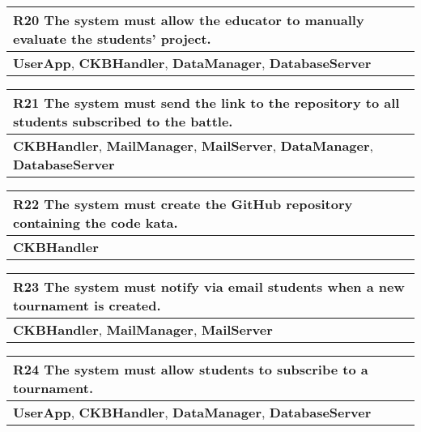 \begin{table}[H]
    \begin{tabularx}{\textwidth}{X}
        \toprule
        \textbf{R20} The system must allow the educator to manually evaluate the students' project. \\ \midrule
        \textbf{UserApp}, \textbf{CKBHandler}, \textbf{DataManager}, \textbf{DatabaseServer} \\
        \end{tabularx}
\end{table}

\begin{table}[H]
    \begin{tabularx}{\textwidth}{X}
        \toprule
        \textbf{R21} The system must send the link to the repository to all students subscribed to the battle.\\ \midrule
        \textbf{CKBHandler}, \textbf{MailManager}, \textbf{MailServer}, \textbf{DataManager}, \textbf{DatabaseServer} \\
    \end{tabularx}
\end{table}

\begin{table}[H]
    \begin{tabularx}{\textwidth}{X}
        \toprule
        \textbf{R22} The system must create the GitHub repository containing the code kata. \\ \midrule
        \textbf{CKBHandler}                   \\
    \end{tabularx}
\end{table}

\begin{table}[H]
    \begin{tabularx}{\textwidth}{X}
        \toprule
        \textbf{R23} The system must notify via email students when a new tournament is created. \\ \midrule
        \textbf{CKBHandler}, \textbf{MailManager}, \textbf{MailServer} \\
    \end{tabularx}
\end{table}

\begin{table}[H]
    \begin{tabularx}{\textwidth}{X}
        \toprule
        \textbf{R24} The system must allow students to subscribe to a tournament. \\ \midrule
        \textbf{UserApp}, \textbf{CKBHandler}, \textbf{DataManager}, \textbf{DatabaseServer} \\
        \end{tabularx}
\end{table}

